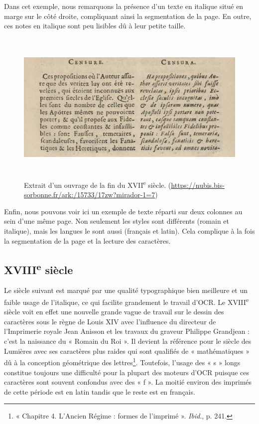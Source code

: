 \documentclass[a4paper,12pt,twoside]{book}
\begin{document}
Dans cet exemple, nous remarquons la présence d'un texte en italique situé en marge sur le côté droite, compliquant ainsi la
segmentation de la page. En outre, ces notes en italique sont peu lisibles dû à leur petite taille. \\


\begin{figure} [H]
	\includegraphics[width=6.13056in,height=2.89236in]{vertopal_157ae480aa4a4b07be198b586a812241/media/image9.png}
	\caption{Extrait d'un ouvrage de la fin du XVII\textsuperscript{e}
		siècle.
		(\url{https://nubis.bis-sorbonne.fr/ark:/15733/17zw?mirador-1=7})}
\end{figure}

Enfin, nous pouvons voir ici un exemple de texte réparti sur deux colonnes au sein d'une même page. Non seulement les styles sont différents (romain et italique), mais les langues le sont aussi (français et latin). Cela complique à la fois la segmentation de la page et la lecture des caractères. 

\subsection{XVIII\textsuperscript{e} siècle}

Le siècle suivant est marqué par une qualité typographique bien
meilleure et un faible usage de l'italique, ce qui facilite grandement
le travail d'OCR. Le XVIII\textsuperscript{e} siècle voit en effet une nouvelle grande vague de travail sur le dessin des caractères sous le règne de Louis XIV avec l'influence du directeur de l'Imprimerie royale Jean Anisson et les travaux du graveur Philippe Grandjean : c'est la naissance du « Romain du Roi ». Il devient la référence pour le siècle des Lumières avec ses caractères plus raides qui sont qualifiés de « mathématiques » dû à la conception géométrique des lettres\footnote{« Chapitre 4. L'Ancien Régime : formes de l'imprimé ». \emph{Ibid}., p. 241.}. Toutefois, l'usage des « s » longs constitue toujours
une difficulté pour la plupart des moteurs d'OCR puisque ces caractères
sont souvent confondus avec des « f ». La moitié environ des imprimés de
cette période est en latin tandis que le reste est en français.
\end{document}

